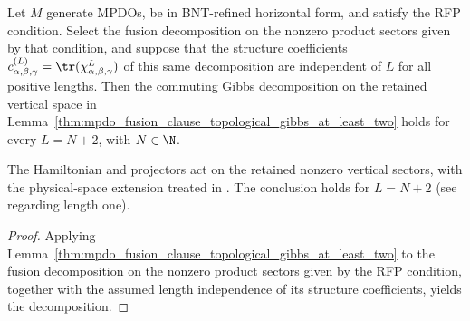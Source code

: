 \begin{lemma}%
    \label{thm:mpdo_topological_gibbs_at_least_two}
    \leanok
    Let $M$ generate MPDOs, be in BNT-refined horizontal form,
    and satisfy the RFP condition. Select the fusion decomposition on the
    nonzero product sectors given by that condition, and suppose that the
    structure coefficients $c_{\alpha,\beta,\gamma}^{(L)}
        =\tr(\chi_{\alpha,\beta,\gamma}^{L})$ of this same decomposition are
    independent of $L$ for all positive lengths. Then the commuting Gibbs
    decomposition on the retained vertical space in
    Lemma~\ref{thm:mpdo_fusion_clause_topological_gibbs_at_least_two}
    holds for every $L=N+2$, with $N\in\N$.

    The Hamiltonian and projectors act on the retained nonzero vertical
    sectors, with the physical-space extension treated in
    \cite{gap:cpsv16_topological_gibbs_physical_complement}.
    The conclusion holds for $L=N+2$ (see
    \cite{gap:cpsv16_topological_gibbs_length_one} regarding length one).
\end{lemma}
\begin{proof}\leanok
    Applying Lemma~\ref{thm:mpdo_fusion_clause_topological_gibbs_at_least_two}
    to the fusion decomposition on the nonzero product sectors given by the
    RFP condition, together with the assumed length independence of its
    structure coefficients, yields the decomposition.
\end{proof}

